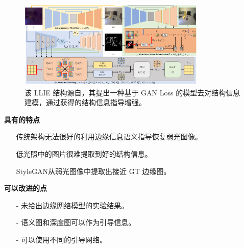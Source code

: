 \documentclass[CJK,aspectratio=169]{beamer}  %
\begin{document}
	\begin{frame}
		\begin{figure}[htbp]
			\begin{center}
				\includegraphics[width=0.8\textwidth]{picture/LLIE/Structure Modeling and Guidance/Overview}
				\caption{
					\tiny 该 LLIE 结构源自\textcolor{blue}{\cite{xu2023low}}，其提出一种基于 GAN Loss 的模型去对结构信息建模，通过获得的结构信息指导增强。
				}
			\end{center}
		\end{figure}
		
		\vspace{-0.5cm}
		
		\begin{minipage}{.6\textwidth}
			\textbf{\tiny 具有的特点}
			\begin{itemize} \tiny
				\item [\checkmark] 传统架构无法很好的利用边缘信息语义指导恢复弱光图像。
				
				\item [\checkmark] 低光照中的图片很难提取到好的结构信息。
				
				\item [\checkmark] StyleGAN从弱光图像中提取出接近 GT 边缘图。
			\end{itemize}
		\end{minipage}
		\begin{minipage}{.3\textwidth}
			\textbf{\tiny 可以改进的点}
			\begin{itemize}\tiny
			\item [-] 未给出边缘网络模型的实验结果。
			
			\item [-] 语义图和深度图可以作为引导信息。
			
			\item [-] 可以使用不同的引导网络。
			
			\end{itemize}
		\end{minipage}
	\end{frame}
	
\end{document}
